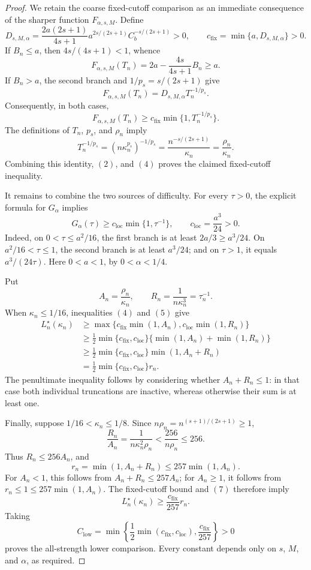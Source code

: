 \documentclass{article}
\begin{document}
\begin{proof}
We retain the coarse fixed-cutoff comparison as an immediate consequence
of the sharper function \(F_{\alpha,s,M}\).  Define
\[
 D_{s,M,\alpha}
 =\frac{2a(2s+1)}{4s+1}
   a^{2s/(2s+1)}C_b^{-s/(2s+1)}>0,
 \qquad
 c_{\mathrm{fix}}=\min\{a,D_{s,M,\alpha}\}>0.
\]
If \(B_n\le a\), then \(4s/(4s+1)<1\), whence
\[
 F_{\alpha,s,M}(T_n)
 =2a-\frac{4s}{4s+1}B_n\ge a.
\]
If \(B_n>a\), the second branch and
\(1/p_s=s/(2s+1)\) give
\[
 F_{\alpha,s,M}(T_n)
 =D_{s,M,\alpha}T_n^{-1/p_s}.
\]
Consequently, in both cases,
\[
 F_{\alpha,s,M}(T_n)
 \ge c_{\mathrm{fix}}\min\{1,T_n^{-1/p_s}\}.
 \tag{4}
\]
The definitions of \(T_n\), \(p_s\), and \(\rho_n\) imply
\[
 T_n^{-1/p_s}
 =(n\kappa_n^{p_s})^{-1/p_s}
 =\frac{n^{-s/(2s+1)}}{\kappa_n}
 =\frac{\rho_n}{\kappa_n}.
\]
Combining this identity, \((2)\), and \((4)\) proves the claimed
fixed-cutoff inequality.

It remains to combine the two sources of difficulty.  For every
\(\tau>0\), the explicit formula for \(G_\alpha\) implies
\[
 G_\alpha(\tau)\ge c_{\mathrm{loc}}\min\{1,\tau^{-1}\},
 \qquad c_{\mathrm{loc}}=\frac{a^3}{24}>0.
 \tag{5}
\]
Indeed, on \(0<\tau\le a^2/16\), the first branch is at least
\(2a/3\ge a^3/24\).  On \(a^2/16<\tau\le1\), the second branch is at
least \(a^3/24\); and on \(\tau>1\), it equals
\(a^3/(24\tau)\).  Here \(0<a<1\), by \(0<\alpha<1/4\).

Put
\[
 A_n=\frac{\rho_n}{\kappa_n},
 \qquad R_n=\frac1{n\kappa_n^3}=\tau_n^{-1}.
\]
When \(\kappa_n\le1/16\), inequalities \((4)\) and \((5)\) give
\[
 \begin{aligned}
 L_n^\star(\kappa_n)
 &\ge\max\{c_{\mathrm{fix}}\min(1,A_n),
              c_{\mathrm{loc}}\min(1,R_n)\}\\
 &\ge\frac12\min\{c_{\mathrm{fix}},c_{\mathrm{loc}}\}
       \{\min(1,A_n)+\min(1,R_n)\}\\
 &\ge\frac12\min\{c_{\mathrm{fix}},c_{\mathrm{loc}}\}
       \min(1,A_n+R_n)\\
 &=\frac12\min\{c_{\mathrm{fix}},c_{\mathrm{loc}}\}r_n.
 \tag{6}
 \end{aligned}
\]
The penultimate inequality follows by considering whether
\(A_n+R_n\le1\): in that case both individual truncations are inactive,
whereas otherwise their sum is at least one.

Finally, suppose \(1/16<\kappa_n\le1/8\).  Since
\(n\rho_n=n^{(s+1)/(2s+1)}\ge1\),
\[
 \frac{R_n}{A_n}
 =\frac1{n\kappa_n^2\rho_n}
 <\frac{256}{n\rho_n}
 \le256.
\]
Thus \(R_n\le256A_n\), and
\[
 r_n=\min(1,A_n+R_n)\le257\min(1,A_n).
 \tag{7}
\]
For \(A_n<1\), this follows from
\(A_n+R_n\le257A_n\); for \(A_n\ge1\), it follows from
\(r_n\le1\le257\min(1,A_n)\).  The fixed-cutoff bound and \((7)\)
therefore imply
\[
 L_n^\star(\kappa_n)\ge\frac{c_{\mathrm{fix}}}{257}r_n.
\]
Taking
\[
 C_{\mathrm{low}}
 =\min\left\{
 \frac12\min(c_{\mathrm{fix}},c_{\mathrm{loc}}),
 \frac{c_{\mathrm{fix}}}{257}
 \right\}>0
\]
proves the all-strength lower comparison.  Every constant depends only
on \(s\), \(M\), and \(\alpha\), as required.
\end{proof}
\end{document}
